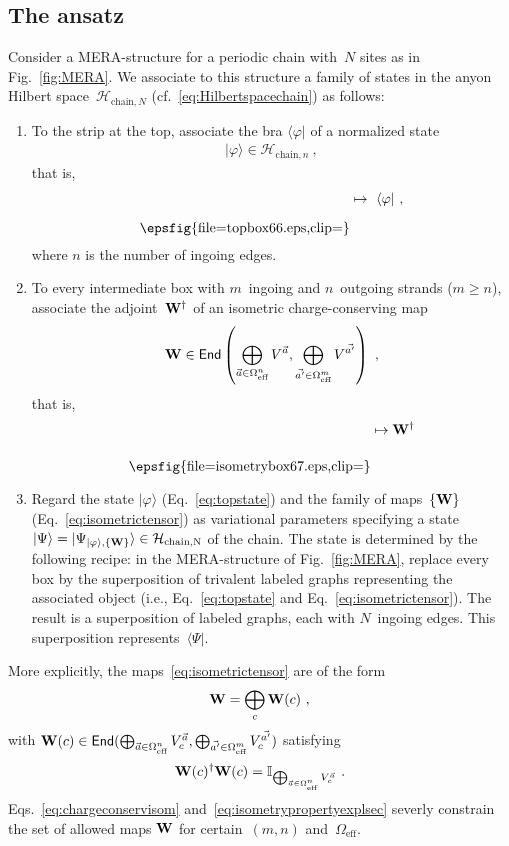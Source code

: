 \documentclass[floats,prb,twocolumn]{revtex4}
\newcommand*{\cH}{\mathcal{H}}
\newcommand*{\End}{\mathsf{End}}
\newcommand{\id}{\mathbb{I}}
\def\id{\mathbb{I}}
\newcommand{\ket}[1]{|#1\rangle}
\newcommand{\bra}[1]{\langle#1|}
\newcommand*{\Xisometry}{{\bf W}}
\newcommand*{\topbox}{\raisebox{-21.123pt}{\epsfig{file=topbox66.eps,clip=}}}
\newcommand*{\isometrybox}{\raisebox{-26.103pt}{\epsfig{file=isometrybox67.eps,clip=}}}
\begin{document}
\subsection{The ansatz}
Consider a MERA-structure for a periodic chain with~$N$ sites as in Fig.~\ref{fig:MERA}. We associate to this structure a family of states in the anyon Hilbert space~$\cH_{\textrm{chain},N}$ (cf.~\eqref{eq:Hilbertspacechain}) as follows:
\begin{enumerate}
\item To the strip at the top, associate the bra $\bra{\varphi}$ of a normalized state~
\begin{align}\ket{\varphi}\in\cH_{\textrm{chain},n}\ ,\label{eq:chainstatetop}
\end{align} 
that is,
\begin{align} 
\topbox\mapsto\ \bra{\varphi}\ ,\label{eq:topstate}
\end{align} 
where $n$ is the number of ingoing edges. 
\item
To every intermediate box with $m$~ingoing and $n$~outgoing strands ($m\geq n$), associate the adjoint~$\Xisometry^\dagger$ of an isometric
charge-conserving map
\begin{align}
\Xisometry\in\End\left(\bigoplus_{\vec{a}\in\Omega_{\textrm{eff}}^n}V^{\vec{a}},\bigoplus_{\vec{a'}\in\Omega_{\textrm{eff}}^m} V^{\vec{a'}}\right)\ ,\label{eq:isometrictensor}
\end{align}
that is,  
\begin{align*}
\isometrybox\mapsto\Xisometry^\dagger
\end{align*}
\item Regard the state $\ket{\varphi}$ (Eq.~\eqref{eq:topstate}) and the family of maps~$\{\Xisometry\}$ (Eq.~\eqref{eq:isometrictensor}) as variational parameters specifying a state $\ket{\Psi}=\ket{\Psi_{\ket{\varphi},\{\Xisometry\}}}\in\cH_{\textrm{chain,N}}$ of the chain. The state is determined by the following recipe: in the MERA-structure of Fig.~\ref{fig:MERA}, replace every box by the superposition of trivalent labeled graphs representing the associated object (i.e., Eq.~\eqref{eq:topstate} and Eq.~\eqref{eq:isometrictensor}). The result is a superposition of labeled graphs, each with $N$~ingoing edges. This superposition represents~$\bra{\Psi}$.
\end{enumerate}

\noindent More explicitly, the maps~\eqref{eq:isometrictensor} are of the form 
\begin{align}
\Xisometry=\bigoplus_c \Xisometry(c)\ ,\label{eq:chargeconservisom}
\end{align}
with $\Xisometry(c)\in\End(\bigoplus_{\vec{a}\in\Omega_{\textrm{eff}}^n}V^{\vec{a}}_c,\bigoplus_{\vec{a'}\in\Omega_{\textrm{eff}}^m}V^{\vec{a'}}_c)$ satisfying
\begin{align}
\Xisometry(c)^\dagger\Xisometry(c)=\id_{\bigoplus_{\vec{a}\in\Omega_{\textrm{eff}}^n}V^{\vec{a}}_c}\ .\label{eq:isometrypropertyexplsec}
\end{align}
Eqs.~\eqref{eq:chargeconservisom} and~\eqref{eq:isometrypropertyexplsec} severly constrain the set of allowed maps $\Xisometry$ for certain~$(m,n)$ and~$\Omega_{\textrm{eff}}$.
\end{document}
